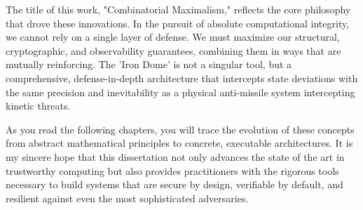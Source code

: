 The title of this work, "Combinatorial Maximalism," reflects the core philosophy that drove these innovations. In the pursuit of absolute computational integrity, we cannot rely on a single layer of defense. We must maximize our structural, cryptographic, and observability guarantees, combining them in ways that are mutually reinforcing. The 'Iron Dome' is not a singular tool, but a comprehensive, defense-in-depth architecture that intercepts state deviations with the same precision and inevitability as a physical anti-missile system intercepting kinetic threats.

As you read the following chapters, you will trace the evolution of these concepts from abstract mathematical principles to concrete, executable architectures. It is my sincere hope that this dissertation not only advances the state of the art in trustworthy computing but also provides practitioners with the rigorous tools necessary to build systems that are secure by design, verifiable by default, and resilient against even the most sophisticated adversaries.
